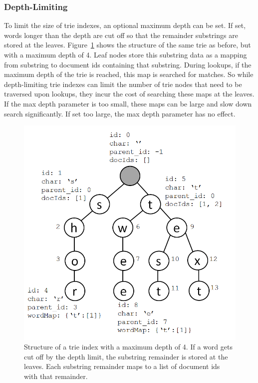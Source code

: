 \documentclass{vldb}
\begin{document}
\subsubsection{Depth-Limiting}
\label{depthlimit}
To limit the size of trie indexes, an optional maximum depth can be set. If set, words longer than the depth are cut off so that the remainder substrings are stored at the leaves. Figure~\ref{triemax} shows the structure of the same trie as before, but with a maximum depth of 4. Leaf nodes store this substring data as a mapping from substring to document ids containing that substring. During lookups, if the maximum depth of the trie is reached, this map is searched for matches. So while depth-limiting trie indexes can limit the number of trie nodes that need to be traversed upon lookups, they incur the cost of searching these maps at the leaves. If the max depth parameter is too small, these maps can be large and slow down search significantly. If set too large, the max depth parameter has no effect.

\begin{figure}[h!]
  \centering
   \includegraphics[scale=.35]{trie_maxdepth_figure}
  \caption{Structure of a trie index with a maximum depth of 4. If a word gets cut off by the depth limit, the substring remainder is stored at the leaves. Each substring remainder maps to a list of document ids with that remainder.}
\label{triemax}
\end{figure}
\end{document}
